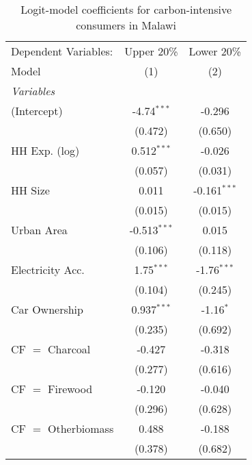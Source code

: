
\begin{table}[htbp!]
   \centering
   \small
   \begin{adjustbox}{width = 1\textwidth, max height = 0.95\textheight, center}
      \begin{threeparttable}[b]
         \caption{\label{tab:Logit_1_MWI} Logit-model coefficients for carbon-intensive consumers in Malawi}
         \begin{tabular}{lcc}
            \tabularnewline \midrule \midrule
            Dependent Variables: & Upper 20\%     & Lower 20\%\\   
            Model                & (1)            & (2)\\  
            \midrule
            \emph{Variables}\\
            (Intercept)          & -4.74$^{***}$  & -0.296\\   
                                 & (0.472)        & (0.650)\\   
            HH Exp. (log)        & 0.512$^{***}$  & -0.026\\   
                                 & (0.057)        & (0.031)\\   
            HH Size              & 0.011          & -0.161$^{***}$\\   
                                 & (0.015)        & (0.015)\\   
            Urban Area           & -0.513$^{***}$ & 0.015\\   
                                 & (0.106)        & (0.118)\\   
            Electricity Acc.     & 1.75$^{***}$   & -1.76$^{***}$\\   
                                 & (0.104)        & (0.245)\\   
            Car Ownership        & 0.937$^{***}$  & -1.16$^{*}$\\   
                                 & (0.235)        & (0.692)\\   
            CF $=$ Charcoal      & -0.427         & -0.318\\   
                                 & (0.277)        & (0.616)\\   
            CF $=$ Firewood      & -0.120         & -0.040\\   
                                 & (0.296)        & (0.628)\\   
            CF $=$ Otherbiomass  & 0.488          & -0.188\\   
                                 & (0.378)        & (0.682)\\   

\end{tabular}
\end{threeparttable}
\end{adjustbox}
\end{table}
